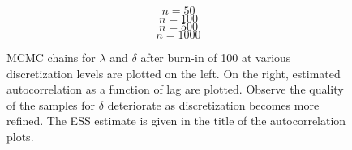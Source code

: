 \documentclass{article}
\begin{document}
\begin{figure}
\vspace{-7em}
  $$ n = 50 $$
  $$ n = 100 $$
  $$ n = 500 $$
  $$ n = 1000 $$
  \caption{MCMC chains for $\lambda$ and $\delta$ after burn-in of 100 at various discretization levels are plotted on the left.  
    On the right, estimated autocorrelation as a function of lag are plotted.  
    Observe the quality of the samples for $\delta$ deteriorate as discretization becomes more refined. 
    The ESS estimate is given in the title of the autocorrelation plots.
  }\label{chain_deterioration}
\end{figure}
\end{document}

